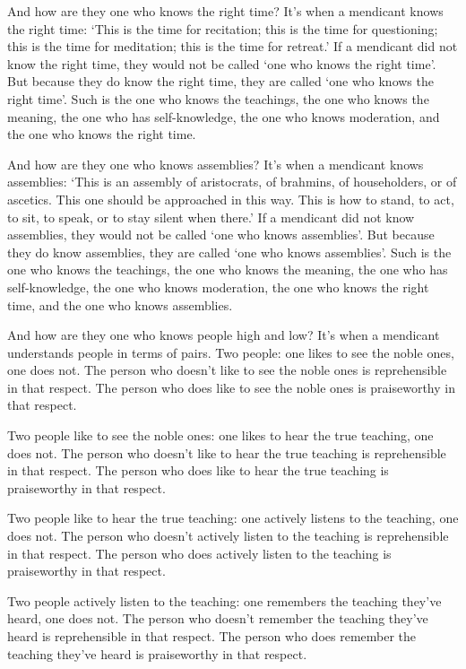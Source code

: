 \documentclass[12pt,openany]{book}%
\begin{document}
And how are they one who knows the right time? It’s when a mendicant knows the right time: ‘This is the time for recitation; this is the time for questioning; this is the time for meditation; this is the time for retreat.’ If a mendicant did not know the right time, they would not be called ‘one who knows the right time’. But because they do know the right time, they are called ‘one who knows the right time’. Such is the one who knows the teachings, the one who knows the meaning, the one who has self-knowledge, the one who knows moderation, and the one who knows the right time. 

And how are they one who knows assemblies? It’s when a mendicant knows assemblies: ‘This is an assembly of aristocrats, of brahmins, of householders, or of ascetics. This one should be approached in this way. This is how to stand, to act, to sit, to speak, or to stay silent when there.’ If a mendicant did not know assemblies, they would not be called ‘one who knows assemblies’. But because they do know assemblies, they are called ‘one who knows assemblies’. Such is the one who knows the teachings, the one who knows the meaning, the one who has self-knowledge, the one who knows moderation, the one who knows the right time, and the one who knows assemblies. 

And how are they one who knows people high and low? It’s when a mendicant understands people in terms of pairs. Two people: one likes to see the noble ones, one does not. The person who doesn’t like to see the noble ones is reprehensible in that respect. The person who does like to see the noble ones is praiseworthy in that respect. 

Two people like to see the noble ones: one likes to hear the true teaching, one does not. The person who doesn’t like to hear the true teaching is reprehensible in that respect. The person who does like to hear the true teaching is praiseworthy in that respect. 

Two people like to hear the true teaching: one actively listens to the teaching, one does not. The person who doesn’t actively listen to the teaching is reprehensible in that respect. The person who does actively listen to the teaching is praiseworthy in that respect. 

Two people actively listen to the teaching: one remembers the teaching they’ve heard, one does not. The person who doesn’t remember the teaching they’ve heard is reprehensible in that respect. The person who does remember the teaching they’ve heard is praiseworthy in that respect. 
\end{document}
